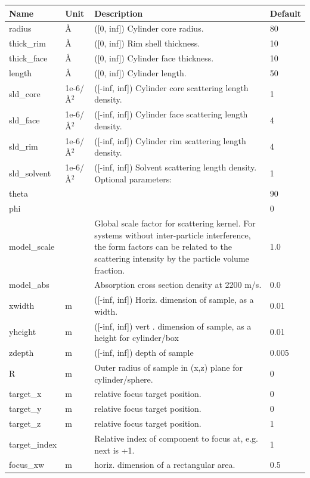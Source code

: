 \begin{longtable}{p{}p{}p{}p{}}
\toprule
\textbf{Name} & \textbf{Unit} & \textbf{Description} & \textbf{Default} \\
\midrule
\endhead
radius & \AA{} & ([0, inf]) Cylinder core radius. & 80 \\
thick\_rim & \AA{} & ([0, inf]) Rim shell thickness. & 10 \\
thick\_face & \AA{} & ([0, inf]) Cylinder face thickness. & 10 \\
length & \AA{} & ([0, inf]) Cylinder length. & 50 \\
sld\_core & 1e-6/\AA{}$^{2}$ & ([-inf, inf]) Cylinder core scattering length density. & 1 \\
sld\_face & 1e-6/\AA{}$^{2}$ & ([-inf, inf]) Cylinder face scattering length density. & 4 \\
sld\_rim & 1e-6/\AA{}$^{2}$ & ([-inf, inf]) Cylinder rim scattering length density. & 4 \\
sld\_solvent & 1e-6/\AA{}$^{2}$ & ([-inf, inf]) Solvent scattering length density. Optional parameters: & 1 \\
theta &  &  & 90 \\
phi &  &  & 0 \\
model\_scale &   & Global scale factor for scattering kernel. For systems without inter-particle interference, the form factors can be related to the scattering intensity by the particle volume fraction. & 1.0 \\
model\_abs &   & Absorption cross section density at 2200 m/s. & 0.0 \\
xwidth & m & ([-inf, inf]) Horiz. dimension of sample, as a width. & 0.01 \\
yheight & m & ([-inf, inf]) vert . dimension of sample, as a height for cylinder/box & 0.01 \\
zdepth & m & ([-inf, inf]) depth of sample & 0.005 \\
R & m & Outer radius of sample in (x,z) plane for cylinder/sphere. & 0 \\
target\_x & m & relative focus target position. & 0 \\
target\_y & m & relative focus target position. & 0 \\
target\_z & m & relative focus target position. & 1 \\
target\_index &   & Relative index of component to focus at, e.g. next is +1. & 1 \\
focus\_xw & m & horiz. dimension of a rectangular area. & 0.5 \\

\end{longtable}
